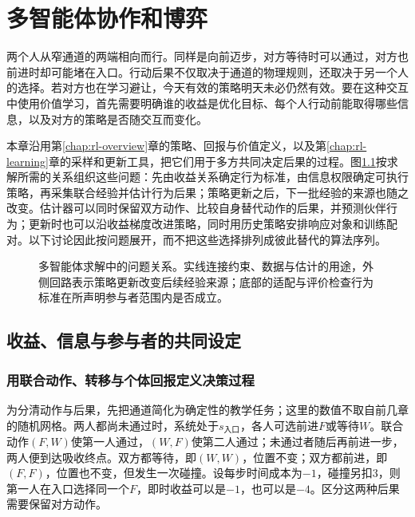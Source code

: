 \chapter{多智能体协作和博弈}
\label{chap:rl-multi-agent}

两个人从窄通道的两端相向而行。同样是向前迈步，对方等待时可以通过，对方也前进时却可能堵在入口。行动后果不仅取决于通道的物理规则，还取决于另一个人的选择。若对方也在学习避让，今天有效的策略明天未必仍然有效。要在这种交互中使用价值学习，首先需要明确谁的收益是优化目标、每个人行动前能取得哪些信息，以及对方的策略是否随交互而变化。

本章沿用第\ref{chap:rl-overview}章的策略、回报与价值定义，以及第\ref{chap:rl-learning}章的采样和更新工具，把它们用于多方共同决定后果的过程。图\ref{fig:rl-multi-agent-map}按求解所需的关系组织这些问题：先由收益关系确定行为标准，由信息权限确定可执行策略，再采集联合经验并估计行为后果；策略更新之后，下一批经验的来源也随之改变。估计器可以同时保留双方动作、比较自身替代动作的后果，并预测伙伴行为；更新时也可以沿收益梯度改进策略，同时用历史策略安排响应对象和训练配对。以下讨论因此按问题展开，而不把这些选择排列成彼此替代的算法序列。

\begin{figure}[htbp]
  \centering
  
  \caption{多智能体求解中的问题关系。实线连接约束、数据与估计的用途，外侧回路表示策略更新改变后续经验来源；底部的适配与评价检查行为标准在所声明参与者范围内是否成立。}
  \label{fig:rl-multi-agent-map}
\end{figure}

\section{收益、信息与参与者的共同设定}
\label{sec:rl-multi-agent-setting}

\subsection{用联合动作、转移与个体回报定义决策过程}
\label{sec:rl-multi-agent-process}

为分清动作与后果，先把通道简化为确定性的教学任务；这里的数值不取自前几章的随机网格。两人都尚未通过时，系统处于$s_{\text{入口}}$，各人可选前进$F$或等待$W$。联合动作$(F,W)$使第一人通过，$(W,F)$使第二人通过；未通过者随后再前进一步，两人便到达吸收终点。双方都等待，即$(W,W)$，位置不变；双方都前进，即$(F,F)$，位置也不变，但发生一次碰撞。设每步时间成本为$-1$，碰撞另扣$3$，则第一人在入口选择同一个$F$，即时收益可以是$-1$，也可以是$-4$。区分这两种后果需要保留对方动作。

